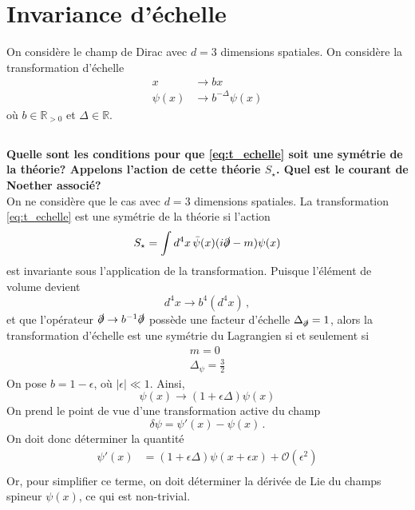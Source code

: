\documentclass{article}
\numberwithin{equation}{section}
\theoremstyle{solution}
\begin{document}
\section{Invariance d’échelle}
On considère le champ de Dirac avec $d=3$ dimensions spatiales. On considère la transformation d'échelle
\begin{equation}\label{eq:t_echelle}
        \begin{split}
                x &\rightarrow  b x \\
                \psi(x) &\rightarrow b^{-\Delta} \psi(x)
        \end{split}
\end{equation} 
où $b \in \mathbb{R}_{>0}$ et $\Delta \in \mathbb{R}$.

\subsection{}
\textbf{Quelle sont les conditions pour que \eqref{eq:t_echelle} soit une symétrie de la théorie? Appelons l’action
de cette théorie $S_{\star}$. Quel est le courant de Noether associé?} \\
On ne considère que le cas avec $d = 3$ dimensions spatiales.
La transformation \eqref{eq:t_echelle} est une symétrie de la théorie si l'action 
\begin{equation}\label{eq:action}
        S_\star = \int d^{4}x\, \bar{\psi}(x)(i \slashed{\partial} - m)\psi(x)
\end{equation} 
est invariante sous l'application de la transformation. Puisque l'élément de volume devient
\begin{equation}
        d^{4}x \rightarrow b^{4}(d^{4}x)\, ,
\end{equation} 
et que l'opérateur $\slashed{\partial} \rightarrow b^{-1} \slashed{\partial}$ possède une facteur d'échelle $\Delta_{\slashed{\partial}} = 1$, alors 
la transformation d'échelle est une symétrie du Lagrangien si et seulement si
\begin{equation}
        \boxed{
        \begin{split}
              m = 0 \\
              \Delta_\psi = \frac{3}{2}
        \end{split}
}
\end{equation} 
On pose $b = 1 - \epsilon$, où $|\epsilon| \ll 1$. Ainsi, 
\begin{equation}
        \psi(x) \rightarrow  (1 + \epsilon\Delta ) \psi(x)
\end{equation} 
On prend le point de vue d'une transformation active du champ
\begin{equation}
        \delta \psi = \psi'(x) - \psi(x) \, .
\end{equation} 
On doit donc déterminer la quantité
\begin{align*}
        \psi'(x) &=  (1 + \epsilon\Delta ) \psi(x + \epsilon x) + \mathcal{O}(\epsilon^{2}) \\
\end{align*}
Or, pour simplifier ce terme, on doit déterminer la dérivée de Lie du champs spineur $\psi(x)$, ce qui est non-trivial.
\end{document}
